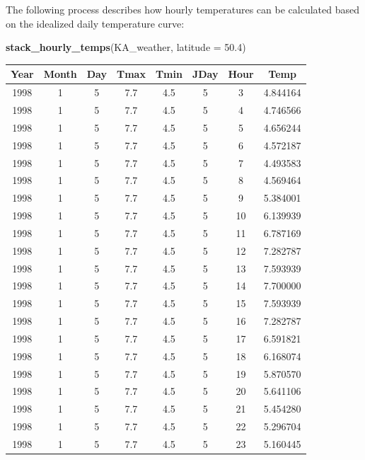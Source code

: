 \documentclass[
]{article}
\newenvironment{Shaded}{\begin{snugshade}}{\end{snugshade}}
\newcommand{\AttributeTok}[1]{\textcolor[rgb]{0.13,0.29,0.53}{#1}}
\newcommand{\FloatTok}[1]{\textcolor[rgb]{0.00,0.00,0.81}{#1}}
\newcommand{\FunctionTok}[1]{\textcolor[rgb]{0.13,0.29,0.53}{\textbf{#1}}}
\newcommand{\NormalTok}[1]{#1}
\begin{document}
The following process describes how hourly temperatures can be calculated based on the idealized daily temperature curve:

\begin{Shaded}
\begin{Highlighting}[]
\FunctionTok{stack\_hourly\_temps}\NormalTok{(KA\_weather, }\AttributeTok{latitude =} \FloatTok{50.4}\NormalTok{)}
\end{Highlighting}
\end{Shaded}

\begin{table}
\centering\begingroup\fontsize{15}{17}\selectfont

\begin{tabular}{c|c|c|c|c|c|c|c}
\hline
Year & Month & Day & Tmax & Tmin & JDay & Hour & Temp\\
\hline
1998 & 1 & 5 & 7.7 & 4.5 & 5 & 3 & 4.844164\\
\hline
1998 & 1 & 5 & 7.7 & 4.5 & 5 & 4 & 4.746566\\
\hline
1998 & 1 & 5 & 7.7 & 4.5 & 5 & 5 & 4.656244\\
\hline
1998 & 1 & 5 & 7.7 & 4.5 & 5 & 6 & 4.572187\\
\hline
1998 & 1 & 5 & 7.7 & 4.5 & 5 & 7 & 4.493583\\
\hline
1998 & 1 & 5 & 7.7 & 4.5 & 5 & 8 & 4.569464\\
\hline
1998 & 1 & 5 & 7.7 & 4.5 & 5 & 9 & 5.384001\\
\hline
1998 & 1 & 5 & 7.7 & 4.5 & 5 & 10 & 6.139939\\
\hline
1998 & 1 & 5 & 7.7 & 4.5 & 5 & 11 & 6.787169\\
\hline
1998 & 1 & 5 & 7.7 & 4.5 & 5 & 12 & 7.282787\\
\hline
1998 & 1 & 5 & 7.7 & 4.5 & 5 & 13 & 7.593939\\
\hline
1998 & 1 & 5 & 7.7 & 4.5 & 5 & 14 & 7.700000\\
\hline
1998 & 1 & 5 & 7.7 & 4.5 & 5 & 15 & 7.593939\\
\hline
1998 & 1 & 5 & 7.7 & 4.5 & 5 & 16 & 7.282787\\
\hline
1998 & 1 & 5 & 7.7 & 4.5 & 5 & 17 & 6.591821\\
\hline
1998 & 1 & 5 & 7.7 & 4.5 & 5 & 18 & 6.168074\\
\hline
1998 & 1 & 5 & 7.7 & 4.5 & 5 & 19 & 5.870570\\
\hline
1998 & 1 & 5 & 7.7 & 4.5 & 5 & 20 & 5.641106\\
\hline
1998 & 1 & 5 & 7.7 & 4.5 & 5 & 21 & 5.454280\\
\hline
1998 & 1 & 5 & 7.7 & 4.5 & 5 & 22 & 5.296704\\
\hline
1998 & 1 & 5 & 7.7 & 4.5 & 5 & 23 & 5.160445\\
\hline
\end{tabular}
\endgroup{}
\end{table}
\end{document}
